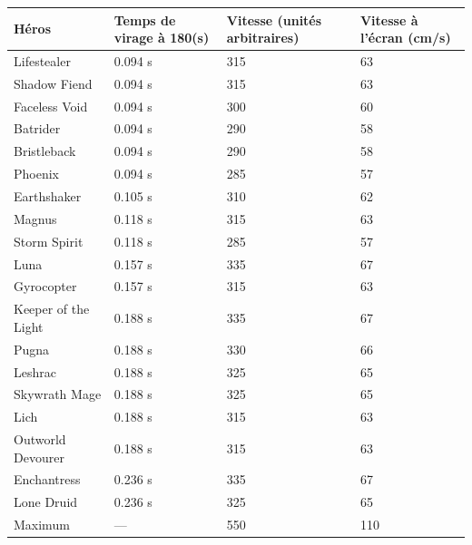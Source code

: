 	
	\newcommand{\newrow}{\bigstrut[t] \\ \hline}
	\begin{table}[htb]
		\centering
		\begin{tabularx}{\textwidth}{ Y X X X } %
		Héros				&	Temps de virage à 180\textdegree(s)	&	Vitesse (unités arbitraires)	&	Vitesse à l'écran (cm/s)	\newrow
		Lifestealer			&	0.094 s								&	315								&	63							\newrow
		Shadow Fiend		&	0.094 s								&	315								&	63							\newrow
		Faceless Void		&	0.094 s								&	300								&	60							\newrow
		Batrider			&	0.094 s								&	290								&	58							\newrow
		Bristleback			&	0.094 s								&	290								&	58							\newrow
		Phoenix				&	0.094 s								&	285								&	57							\newrow
		Earthshaker			&	0.105 s								&	310								&	62							\newrow
		Magnus				&	0.118 s								&	315								&	63							\newrow
		Storm Spirit		&	0.118 s								&	285								&	57							\newrow
		Luna				&	0.157 s								&	335								&	67							\newrow
		Gyrocopter			&	0.157 s								&	315								&	63							\newrow
		Keeper of the Light	&	0.188 s								&	335								&	67							\newrow
		Pugna				&	0.188 s								&	330								&	66							\newrow
		Leshrac				&	0.188 s								&	325								&	65							\newrow
		Skywrath Mage		&	0.188 s								&	325								&	65							\newrow
		Lich				&	0.188 s								&	315								&	63							\newrow
		Outworld Devourer	&	0.188 s								&	315								&	63							\newrow
		Enchantress			&	0.236 s								&	335								&	67							\newrow
		Lone Druid			&	0.236 s								&	325								&	65							\newrow
		\og Maximum \fg{}	&	---									&	550								&	110							\bigstrut[t] \\
		\end{tabularx}

\end{table}
